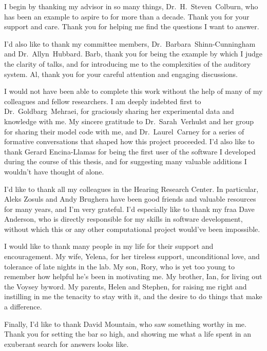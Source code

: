 I begin by thanking my advisor in so many things, Dr.~H.~Steven~Colburn, who has been an example to aspire to for more than a decade.  Thank you for  your support and care.  Thank you for helping me find the questions I want to answer.   

I'd also like to thank my committee members, Dr.~Barbara~Shinn-Cunningham and Dr.~Allyn~Hubbard.  Barb, thank you for being the example by which I judge the clarity of talks, and for introducing me to the complexities of the auditory system.  Al, thank you for your careful attention and engaging discussions.

I would not have been able to complete this work without the help of many of my colleagues and fellow researchers.  I am deeply indebted first to Dr.~Goldbarg~Mehraei, for graciously sharing her experimental data and knowledge with me.  My sincere gratitude to Dr.~Sarah~Verhulst and her group for sharing their model code with me, and Dr.~Laurel~Carney for a series of formative conversations that shaped how this project proceeded.  I'd also like to thank Gerard Encina-Llamas for being the first user of the software I developed during the course of this thesis, and for suggesting many valuable additions I wouldn't have thought of alone.

I'd like to thank all my colleagues in the Hearing Research Center.  In particular, Aleks Zosuls and Andy Brughera have been good friends and valuable resources for many years, and I'm very grateful.  I'd especially like to thank my fraa Dave Anderson, who is directly responsible for my skills in software development, without which this or any other computational project would've been impossible.  

I would like to thank many people in my life for their support and encouragement.   My wife, Yelena, for her tireless support, unconditional love, and  tolerance of late nights in the lab.  My son, Rory, who is yet too young to remember how helpful he's been in motivating me.  My brother, Ian, for living out the Voysey byword.  My parents, Helen and Stephen, for raising me right and instilling in me the tenacity to stay with it, and the desire to do things that make a difference.

Finally, I'd like to thank David Mountain, who saw something worthy in me. Thank you for setting the bar so high, and showing me what a life spent in an exuberant search for answers looks like. 